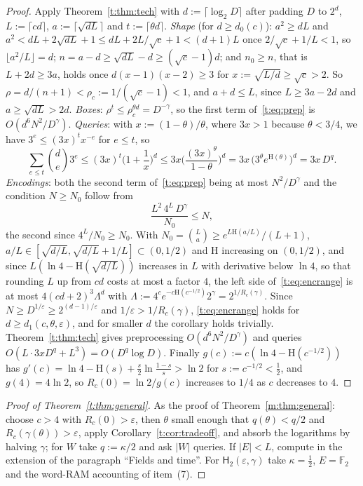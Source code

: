 \documentclass[11pt]{article}
\theoremstyle{definition}
\theoremstyle{remark}
\newcommand{\F}{\mathbb{F}_2}
\newcommand{\Hh}{\mathrm{H}}
\newcommand{\Nz}{N_0}
\newcommand{\Hyp}{\mathsf{H}}
\begin{document}
\begin{proof}
Apply Theorem~\ref{t:thm:tech} with $d:=\lceil\log_2D\rceil$ after padding $D$ to $2^d$, $L:=\lceil cd\rceil$, $a:=\lceil\sqrt{dL}\rceil$ and $t:=\lceil\theta d\rceil$. \emph{Shape} (for $d\ge d_0(c)$): $a^2\ge dL$ and $a^2<dL+2\sqrt{dL}+1\le dL+2L/\sqrt c+1<(d+1)L$ once $2/\sqrt c+1/L<1$, so $\lfloor a^2/L\rfloor=d$; $n=a-d\ge\sqrt{dL}-d\ge(\sqrt c-1)d$; and $n_0\ge n$, that is $L+2d\ge3a$, holds once $d(x-1)(x-2)\ge3$ for $x:=\sqrt{L/d}\ge\sqrt c>2$. So $\rho=d/(n+1)<\rho_c:=1/(\sqrt c-1)<1$, and $a+d\le L$, since $L\ge3a-2d$ and $a\ge\sqrt{dL}>2d$. \emph{Boxes}: $\rho^t\le\rho_c^{\theta d}=D^{-\gamma}$, so the first term of~\eqref{t:eq:prep} is $O(d^6N^2/D^\gamma)$. \emph{Queries}: with $x:=(1-\theta)/\theta$, where $3x>1$ because $\theta<3/4$, we have $3^e\le(3x)^tx^{-e}$ for $e\le t$, so
\[
\sum_{e\le t}\binom de3^e\le(3x)^t\Big(1+\frac1x\Big)^d\le3x\Big(\frac{(3x)^\theta}{1-\theta}\Big)^d=3x\,\big(3^\theta e^{\Hh(\theta)}\big)^d=3x\,D^q.
\]
\emph{Encodings}: both the second term of~\eqref{t:eq:prep} being at most $N^2/D^\gamma$ and the condition $N\ge\Nz$ follow from
\begin{equation}\label{t:eq:encrange}
\frac{L^2\,4^L\,D^\gamma}{\Nz}\le N,
\end{equation}
the second since $4^L/\Nz\ge\Nz$. With $\Nz=\binom La\ge e^{L\Hh(a/L)}/(L+1)$, $a/L\in[\sqrt{d/L},\sqrt{d/L}+1/L]\subset(0,1/2)$ and $\Hh$ increasing on $(0,1/2)$, and since $L(\ln4-\Hh(\sqrt{d/L}))$ increases in $L$ with derivative below $\ln4$, so that rounding $L$ up from $cd$ costs at most a factor $4$, the left side of~\eqref{t:eq:encrange} is at most $4(cd+2)^3\Lambda^d$ with $\Lambda:=4^ce^{-c\Hh(c^{-1/2})}2^\gamma=2^{1/R_c(\gamma)}$. Since $N\ge D^{1/\varepsilon}\ge2^{(d-1)/\varepsilon}$ and $1/\varepsilon>1/R_c(\gamma)$, \eqref{t:eq:encrange} holds for $d\ge d_1(c,\theta,\varepsilon)$, and for smaller $d$ the corollary holds trivially. Theorem~\ref{t:thm:tech} gives preprocessing $O(d^6N^2/D^\gamma)$ and queries $O(L\cdot3xD^q+L^3)=O(D^q\log D)$. Finally $g(c):=c(\ln4-\Hh(c^{-1/2}))$ has $g'(c)=\ln4-\Hh(s)+\frac s2\ln\frac{1-s}s>\ln2$ for $s:=c^{-1/2}<\frac12$, and $g(4)=4\ln2$, so $R_c(0)=\ln2/g(c)$ increases to $1/4$ as $c$ decreases to $4$.
\end{proof}

\begin{proof}[Proof of Theorem~\ref{t:thm:general}]
As the proof of Theorem~\ref{m:thm:general}: choose $c>4$ with $R_c(0)>\varepsilon$, then $\theta$ small enough that $q(\theta)<q/2$ and $R_c(\gamma(\theta))>\varepsilon$, apply Corollary~\ref{t:cor:tradeoff}, and absorb the logarithms by halving $\gamma$; for $W$ take $q:=\kappa/2$ and ask $|W|$ queries. If $|E|<L$, compute in the extension of the paragraph ``Fields and time''. For $\Hyp_2(\varepsilon,\gamma)$ take $\kappa=\frac12$, $E=\F$ and the word-RAM accounting of item~(7).
\end{proof}
\end{document}
